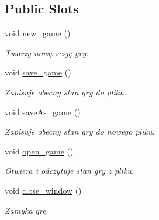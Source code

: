 \subsection*{Public Slots}
\begin{DoxyCompactItemize}
\item 
\mbox{\label{classchess_game_a230eb38f254315b36cd363d9934d4945}} 
void \hyperlink{classchess_game_a230eb38f254315b36cd363d9934d4945}{new\+\_\+game} ()
\begin{DoxyCompactList}\small\item\em Tworzy nową sesję gry. \end{DoxyCompactList}\item 
\mbox{\label{classchess_game_a5aa2f3514c1ef832a80ab5a10288c20e}} 
void \hyperlink{classchess_game_a5aa2f3514c1ef832a80ab5a10288c20e}{save\+\_\+game} ()
\begin{DoxyCompactList}\small\item\em Zapisuje obecny stan gry do pliku. \end{DoxyCompactList}\item 
\mbox{\label{classchess_game_aff9965791d6a11efb08d6c483db6371b}} 
void \hyperlink{classchess_game_aff9965791d6a11efb08d6c483db6371b}{save\+As\+\_\+game} ()
\begin{DoxyCompactList}\small\item\em Zapisuje obecny stan gry do nowego pliku. \end{DoxyCompactList}\item 
\mbox{\label{classchess_game_a5e8b9a01b5d091579e7f13fe742c85b1}} 
void \hyperlink{classchess_game_a5e8b9a01b5d091579e7f13fe742c85b1}{open\+\_\+game} ()
\begin{DoxyCompactList}\small\item\em Otwiera i odczytuje stan gry z pliku. \end{DoxyCompactList}\item 
\mbox{\label{classchess_game_a0fec48a8caa52eca9bb109b1ab7d5aa9}} 
void \hyperlink{classchess_game_a0fec48a8caa52eca9bb109b1ab7d5aa9}{close\+\_\+window} ()
\begin{DoxyCompactList}\small\item\em Zamyka grę \end{DoxyCompactList}\item 

\end{DoxyCompactItemize}
